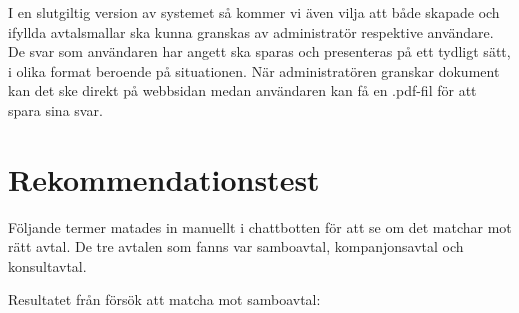 \documentclass[a4paper,12pt]{article}
\begin{document}
I en slutgiltig version av systemet så kommer vi även vilja att både skapade och ifyllda avtalsmallar ska kunna granskas av administratör respektive användare. De svar som användaren har angett ska sparas och presenteras på ett tydligt sätt, i olika format beroende på situationen. När administratören granskar dokument kan det ske direkt på webbsidan medan användaren kan få en .pdf-fil för att spara sina svar.





%

\newpage

%

\newpage
\appendix %

\section{Rekommendationstest} \label{appen:recommendations}

Följande termer matades in manuellt i chattbotten för att se om det matchar mot rätt avtal. De tre avtalen som fanns var samboavtal, kompanjonsavtal och konsultavtal.

Resultatet från försök att matcha mot samboavtal:
\end{document}
